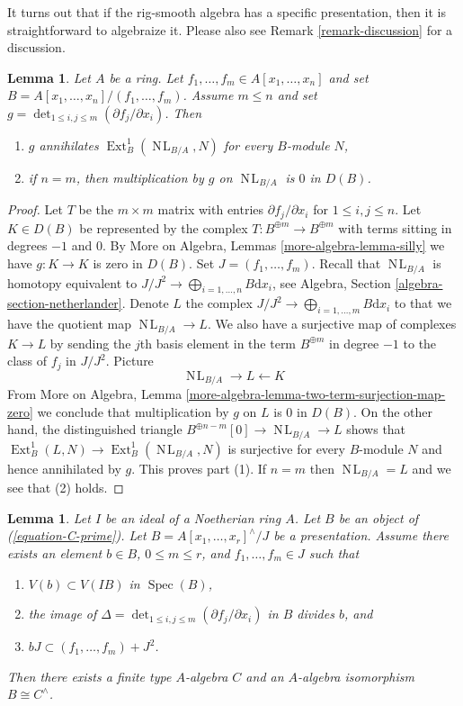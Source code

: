 \documentclass{stacks-project}
\theoremstyle{plain}
\newtheorem{lemma}[subsection]{Lemma}
\theoremstyle{definition}
\theoremstyle{remark}
\numberwithin{equation}{subsection}
\def\Spec{\mathop{\mathrm{Spec}}}
\def\Ext{\mathop{\mathrm{Ext}}\nolimits}
\def\NL{\mathop{N\!L}\nolimits}
\begin{document}
\noindent
It turns out that if the rig-smooth algebra has a specific presentation,
then it is straightforward to algebraize it. Please also see
Remark \ref{remark-discussion} for a discussion.

\begin{lemma}
\label{lemma-presentation-rig-smooth}
Let $A$ be a ring. Let $f_1, \ldots, f_m \in A[x_1, \ldots, x_n]$
and set $B = A[x_1, \ldots, x_n]/(f_1, \ldots, f_m)$. Assume $m \leq n$
and set $g = \det_{1 \leq i, j \leq m}(\partial f_j/\partial x_i)$.
Then
\begin{enumerate}
\item $g$ annihilates $\Ext^1_B(\NL_{B/A}, N)$ for every $B$-module $N$,
\item if $n = m$, then multiplication by $g$ on $\NL_{B/A}$ is $0$ in $D(B)$.
\end{enumerate}
\end{lemma}

\begin{proof}
Let $T$ be the $m \times m$ matrix with entries $\partial f_j/\partial x_i$
for $1 \leq i, j \leq n$. Let $K \in D(B)$ be represented by the complex
$T : B^{\oplus m} \to B^{\oplus m}$ with terms sitting in degrees $-1$ and $0$.
By More on Algebra, Lemmas \ref{more-algebra-lemma-silly}
we have $g : K \to K$ is zero in $D(B)$. Set $J = (f_1, \ldots, f_m)$.
Recall that $\NL_{B/A}$ is homotopy equivalent to
$J/J^2 \to \bigoplus_{i = 1, \ldots, n} B\text{d}x_i$, see
Algebra, Section \ref{algebra-section-netherlander}.
Denote $L$ the complex $J/J^2 \to \bigoplus_{i = 1, \ldots, m} B\text{d}x_i$
to that we have the quotient map $\NL_{B/A} \to L$.
We also have a surjective map of complexes $K \to L$
by sending the $j$th basis element in the term $B^{\oplus m}$
in degree $-1$ to the class of $f_j$ in $J/J^2$. Picture
$$
\NL_{B/A} \to L \leftarrow K
$$
From
More on Algebra, Lemma \ref{more-algebra-lemma-two-term-surjection-map-zero}
we conclude that multiplication by $g$ on $L$ is $0$ in $D(B)$.
On the other hand, the distinguished triangle
$B^{\oplus n - m}[0] \to \NL_{B/A} \to L$
shows that $\Ext^1_B(L, N) \to \Ext^1_B(\NL_{B/A}, N)$ is surjective
for every $B$-module $N$ and hence annihilated by $g$.
This proves part (1).
If $n = m$ then $\NL_{B/A} = L$ and we see that (2) holds.
\end{proof}

\begin{lemma}
\label{lemma-approximate-presentation-rig-smooth}
Let $I$ be an ideal of a Noetherian ring $A$. Let $B$ be an object
of (\ref{equation-C-prime}). Let $B = A[x_1, \ldots, x_r]^\wedge/J$
be a presentation. Assume there exists an element
$b \in B$, $0 \leq m \leq r$, and $f_1, \ldots, f_m \in J$
such that
\begin{enumerate}
\item $V(b) \subset V(IB)$ in $\Spec(B)$,
\item the image of
$\Delta = \det_{1 \leq i, j \leq m}(\partial f_j/\partial x_i)$
in $B$ divides $b$, and
\item $b J \subset (f_1, \ldots, f_m) + J^2$.
\end{enumerate}
Then there exists a finite type $A$-algebra $C$ and an $A$-algebra
isomorphism $B \cong C^\wedge$.
\end{lemma}
\end{document}
